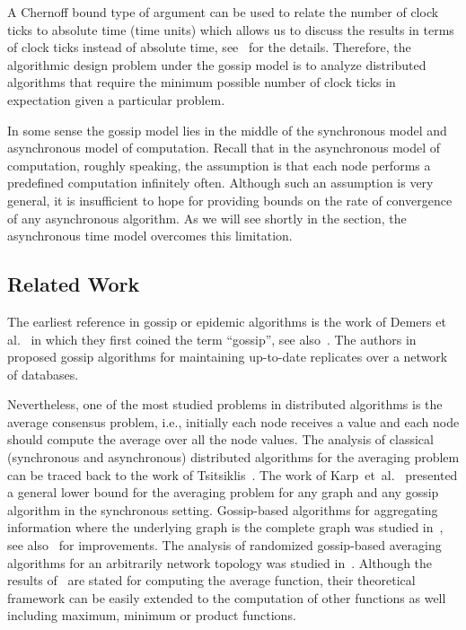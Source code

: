 A Chernoff bound type of argument can be used to relate the number of clock ticks to absolute time (time units) which allows us to discuss the results in terms of clock ticks instead of absolute time, see~\cite{gossip:Boyd} for the details. Therefore, the algorithmic design problem under the gossip model is to analyze distributed algorithms that require the minimum possible number of clock ticks in expectation given a particular problem.
%

%
In some sense the gossip model lies in the middle of the synchronous model and asynchronous model of computation. Recall that in the asynchronous model of computation, roughly speaking, the assumption is that each node performs a predefined computation infinitely often. Although such an assumption is very general, it is insufficient to hope for providing bounds on the rate of convergence of any asynchronous algorithm. As we will see shortly in the section, the asynchronous time model overcomes this limitation.
%
\subsection{Related Work}
%
%
The earliest reference in gossip or epidemic algorithms is the work of Demers et al.~\cite{gossip:Demers} in which they first coined the term ``gossip'', see also~\cite{gossip:Pittel}. The authors in~\cite{gossip:Demers} proposed gossip algorithms for maintaining up-to-date replicates over a network of databases.

Nevertheless, one of the most studied problems in distributed algorithms is the average consensus problem, i.e., initially each node receives a value and each node should compute the average over all the node values. The analysis of classical (synchronous and asynchronous) distributed algorithms for the averaging problem can be traced back to the work of Tsitsiklis~\cite{gossip:TBA86}. The work of Karp~et~al.~\cite{gossip:Karp} presented a general lower bound for the averaging problem for any graph and any gossip algorithm in the synchronous setting. Gossip-based algorithms for aggregating information where the underlying graph is the complete graph was studied in~\cite{gossip:Kempe}, see also~\cite{gossip:KempeImprov} for improvements. The analysis of randomized gossip-based averaging algorithms for an arbitrarily network topology was studied in~\cite{gossip:Boyd}. Although the results of~\cite{gossip:Boyd} are stated for computing the average function, their theoretical framework can be easily extended to the computation of other functions as well including maximum, minimum or product functions.

